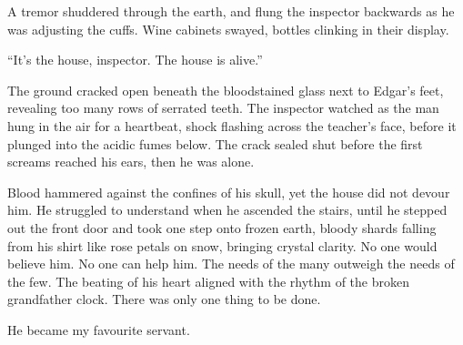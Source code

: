 A tremor shuddered through the earth, and flung the inspector backwards as he was adjusting the cuffs. Wine cabinets swayed, bottles clinking in their display. 

“It’s the house, inspector. The house is alive.”

The ground cracked open beneath the bloodstained glass next to Edgar’s feet, revealing too many rows of serrated teeth. The inspector watched as the man hung in the air for a heartbeat, shock flashing across the teacher's face, before it plunged into the acidic fumes below. The crack sealed shut before the first screams reached his ears, then he was alone. 

Blood hammered against the confines of his skull, yet the house did not devour him. He struggled to understand when he ascended the stairs, until he stepped out the front door and took one step onto frozen earth, bloody shards falling from his shirt like rose petals on snow, bringing crystal clarity. No one would believe him. No one can help him. The needs of the many outweigh the needs of the few. The beating of his heart aligned with the rhythm of the broken grandfather clock. There was only one thing to be done.

He became my favourite servant.
